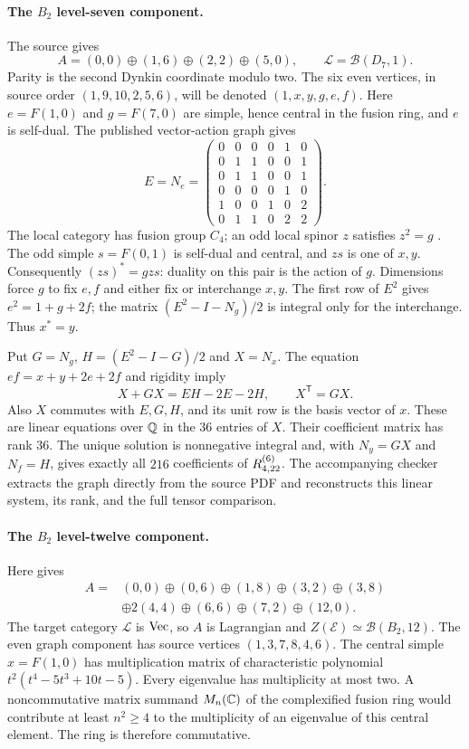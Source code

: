 \paragraph{The $B_2$ level-seven component.}
The source \cite[Section~3.5, Figure~11(a)]{CRT} gives
\[
 A=(0,0)\oplus(1,6)\oplus(2,2)\oplus(5,0),
 \qquad \mathcal L=\mathcal B(D_7,1).
\]
Parity is the second Dynkin coordinate modulo two. The six even vertices,
in source order $(1,9,10,2,5,6)$, will be denoted $(1,x,y,g,e,f)$.
Here $e=F(1,0)$ and $g=F(7,0)$ are simple, hence central in the fusion
ring, and $e$ is self-dual. The published vector-action graph gives
\[
 E=N_e=\begin{pmatrix}
 0&0&0&0&1&0\\
 0&1&1&0&0&1\\
 0&1&1&0&0&1\\
 0&0&0&0&1&0\\
 1&0&0&1&0&2\\
 0&1&1&0&2&2
 \end{pmatrix}.
\]
The local category has fusion group $C_4$; an odd local spinor $z$
satisfies $z^2=g$ \cite[Theorem~7.1]{Bock}. The odd simple
$s=F(0,1)$ is self-dual and central, and $zs$ is one of $x,y$.
Consequently $(zs)^*=gzs$: duality on this pair is the action of $g$.
Dimensions force $g$ to fix $e,f$ and either fix or interchange $x,y$.
The first row of $E^2$ gives $e^2=1+g+2f$; the matrix
$(E^2-I-N_g)/2$ is integral only for the interchange. Thus $x^*=y$.

Put $G=N_g$, $H=(E^2-I-G)/2$ and $X=N_x$.
The equation $ef=x+y+2e+2f$ and rigidity imply
\[
 X+GX=EH-2E-2H,\qquad X^{\mathsf T}=GX.
\]
Also $X$ commutes with $E,G,H$, and its unit row is the basis vector
of $x$. These are linear equations over $\QQ$ in the $36$ entries of
$X$. Their coefficient matrix has rank $36$. The unique solution is
nonnegative integral and, with $N_y=GX$ and $N_f=H$, gives exactly all
$216$ coefficients of $\RR{4}{22}$. The accompanying checker extracts
the graph directly from the source PDF and reconstructs this linear
system, its rank, and the full tensor comparison.

\paragraph{The $B_2$ level-twelve component.}
Here \cite[Section~3.6, Figure~13]{CRT} gives
\begin{align*}
 A={}&(0,0)\oplus(0,6)\oplus(1,8)\oplus(3,2)\oplus(3,8)\\
 &\oplus2(4,4)\oplus(6,6)\oplus(7,2)\oplus(12,0).
\end{align*}
The target category $\mathcal L$ is $\Vec$, so $A$ is Lagrangian and
$Z(\mathcal E)\simeq\mathcal B(B_2,12)$.
The even graph component has source vertices $(1,3,7,8,4,6)$.
The central simple $x=F(1,0)$ has multiplication matrix of characteristic
polynomial $t^2(t^4-5t^3+10t-5)$. Every eigenvalue has multiplicity at
most two. A noncommutative matrix summand $M_n(\CC)$ of the complexified
fusion ring would contribute at least $n^2\ge4$ to the multiplicity of
an eigenvalue of this central element. The ring is therefore commutative.

